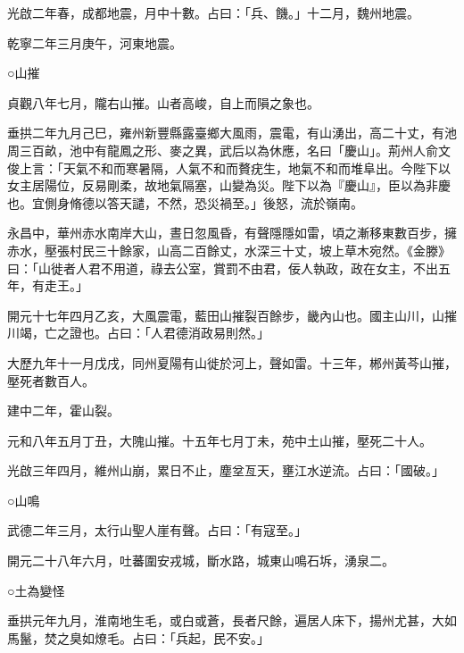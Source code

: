 \begin{pinyinscope}
 光啟二年春，成都地震，月中十數。占曰：「兵、饑。」十二月，魏州地震。



 乾寧二年三月庚午，河東地震。



 ○山摧



 貞觀八年七月，隴右山摧。山者高峻，自上而隕之象也。



 垂拱二年九月己巳，雍州新豐縣露臺鄉大風雨，震電，有山湧出，高二十丈，有池周三百畝，池中有龍鳳之形、麥之異，武后以為休應，名曰「慶山」。荊州人俞文俊上言：「天氣不和而寒暑隔，人氣不和而贅疣生，地氣不和而堆阜出。今陛下以女主居陽位，反易剛柔，故地氣隔塞，山變為災。陛下以為『慶山』，臣以為非慶也。宜側身脩德以答天譴，不然，恐災禍至。」後怒，流於嶺南。



 永昌中，華州赤水南岸大山，晝日忽風昏，有聲隱隱如雷，頃之漸移東數百步，擁赤水，壓張村民三十餘家，山高二百餘丈，水深三十丈，坡上草木宛然。《金滕》曰：「山徙者人君不用道，祿去公室，賞罰不由君，佞人執政，政在女主，不出五年，有走王。」



 開元十七年四月乙亥，大風震電，藍田山摧裂百餘步，畿內山也。國主山川，山摧川竭，亡之證也。占曰：「人君德消政易則然。」



 大歷九年十一月戊戌，同州夏陽有山徙於河上，聲如雷。十三年，郴州黃芩山摧，壓死者數百人。



 建中二年，霍山裂。



 元和八年五月丁丑，大隗山摧。十五年七月丁未，苑中土山摧，壓死二十人。



 光啟三年四月，維州山崩，累日不止，塵坌亙天，壅江水逆流。占曰：「國破。」



 ○山鳴



 武德二年三月，太行山聖人崖有聲。占曰：「有寇至。」



 開元二十八年六月，吐蕃圍安戎城，斷水路，城東山鳴石坼，湧泉二。



 ○土為變怪



 垂拱元年九月，淮南地生毛，或白或蒼，長者尺餘，遍居人床下，揚州尤甚，大如馬鬣，焚之臭如燎毛。占曰：「兵起，民不安。」




\end{pinyinscope}
